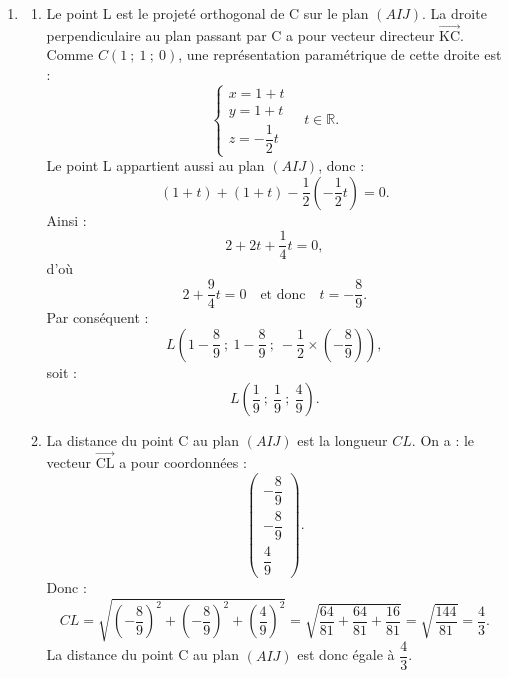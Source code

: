 \documentclass[10pt]{article}
\providecommand{\R}{\mathbb{R}}
\providecommand{\vectt}[1]{\overrightarrow{\mathrm{#1}}}
\begin{document}
\begin{enumerate}
\begin{enumerate}
		\item Comme le vecteur $\vectt{KC}$ a pour coordonnées $\begin{pmatrix}1\\1\\-\dfrac12\end{pmatrix}$ et est un vecteur normal au plan $(AIJ)$, une équation cartésienne de ce plan est de la forme :
		\[
		x+y-\dfrac12 z+d=0.
		\]
		Le point $A(0~;~0~;~0)$ appartient au plan, donc $d=0$.
		Ainsi, une équation cartésienne du plan $(AIJ)$ est :
		\[
		x+y-\dfrac12 z=0.
		\]
	\end{enumerate}

	\item \begin{enumerate}
		\item Le point L est le projeté orthogonal de C sur le plan $(AIJ)$.
		La droite perpendiculaire au plan passant par C a pour vecteur directeur $\vectt{KC}$.
		Comme $C(1~;~1~;~0)$, une représentation paramétrique de cette droite est :
		\[
		\begin{cases}
		x=1+t\\
		y=1+t\\
		z=-\dfrac12t
		\end{cases}
		\quad t\in\R.
		\]
		Le point L appartient aussi au plan $(AIJ)$, donc :
		\[
		(1+t)+(1+t)-\dfrac12\left(-\dfrac12t\right)=0.
		\]
		Ainsi :
		\[
		2+2t+\dfrac14t=0,
		\]
		d'où
		\[
		2+\dfrac94t=0
		\quad\text{et donc}\quad
		t=-\dfrac89.
		\]
		Par conséquent :
		\[
		L\left(1-\dfrac89~;~1-\dfrac89~;~-\dfrac12\times\left(-\dfrac89\right)\right),
		\]
		soit :
		\[
		L\left(\dfrac19~;~\dfrac19~;~\dfrac49\right).
		\]

		\item La distance du point C au plan $(AIJ)$ est la longueur $CL$.
		On a :
		le vecteur $\vectt{CL}$ a pour coordonnées :
		\[
		\begin{pmatrix}-\dfrac89\\-\dfrac89\\\dfrac49\end{pmatrix}.
		\]
		Donc :
		\[
		CL=\sqrt{\left(-\dfrac89\right)^2+\left(-\dfrac89\right)^2+\left(\dfrac49\right)^2}
		=\sqrt{\dfrac{64}{81}+\dfrac{64}{81}+\dfrac{16}{81}}
		=\sqrt{\dfrac{144}{81}}
		=\dfrac43.
		\]
		La distance du point C au plan $(AIJ)$ est donc égale à $\dfrac43$.
	\end{enumerate}


\end{enumerate}
\end{document}

